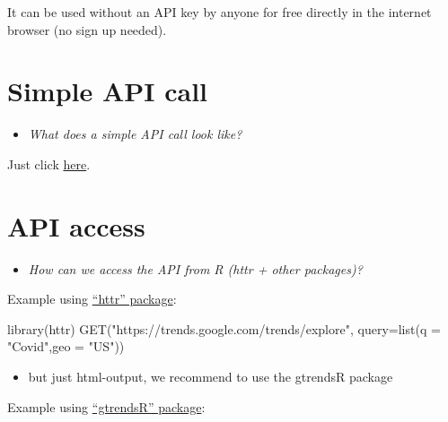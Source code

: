 \documentclass[
]{book}
\newenvironment{Shaded}{\begin{snugshade}}{\end{snugshade}}
\newcommand{\AttributeTok}[1]{\textcolor[rgb]{0.77,0.63,0.00}{#1}}
\newcommand{\FunctionTok}[1]{\textcolor[rgb]{0.00,0.00,0.00}{#1}}
\newcommand{\NormalTok}[1]{#1}
\newcommand{\StringTok}[1]{\textcolor[rgb]{0.31,0.60,0.02}{#1}}
\providecommand{\tightlist}{%
  \setlength{\itemsep}{0pt}\setlength{\parskip}{0pt}}
\begin{document}
It can be used without an API key by anyone for free directly in the internet browser (no sign up needed).

\hypertarget{simple-api-call-7}{%
\section{Simple API call}\label{simple-api-call-7}}

\begin{itemize}
\tightlist
\item
  \emph{What does a simple API call look like?}
\end{itemize}

Just click \href{https://trends.google.com/trends}{here}.

\hypertarget{api-access-7}{%
\section{API access}\label{api-access-7}}

\begin{itemize}
\tightlist
\item
  \emph{How can we access the API from R (httr + other packages)?}
\end{itemize}

Example using \href{https://cran.r-project.org/web/packages/httr/httr.pdf}{``httr'' package}:

\begin{Shaded}
\begin{Highlighting}[]
\FunctionTok{library}\NormalTok{(httr)}
\FunctionTok{GET}\NormalTok{(}\StringTok{"https://trends.google.com/trends/explore"}\NormalTok{,}
    \AttributeTok{query=}\FunctionTok{list}\NormalTok{(}\AttributeTok{q =} \StringTok{"Covid"}\NormalTok{,}\AttributeTok{geo =} \StringTok{"US"}\NormalTok{))}
\end{Highlighting}
\end{Shaded}

\begin{itemize}
\tightlist
\item
  but just html-output, we recommend to use the gtrendsR package
\end{itemize}

Example using \href{https://cran.r-project.org/web/packages/gtrendsR/gtrendsR.pdf}{``gtrendsR'' package}:
\end{document}
